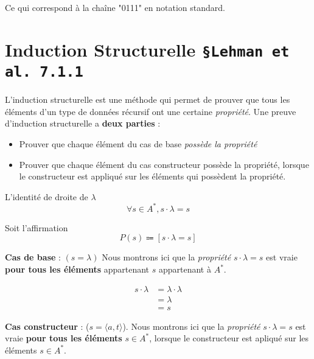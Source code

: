 \documentclass[16pt]{report}
\begin{document}
\begin{multicols*}{2}
\begin{EExample}{}{}
Ce qui correspond à la chaîne "0111" en notation standard.
\end{EExample}


    \section{Induction Structurelle \texttt{\small{\S Lehman et al. 7.1.1}}}
    L'induction structurelle est une méthode qui permet de prouver que tous les éléments d'un type de données 
    récursif ont une certaine \textit{propriété}. Une preuve d'induction structurelle a \textbf{deux parties} : 

    \begin{itemize}
        \item Prouver que chaque élément du cas de base \textit{possède la propriété}  
        \item Prouver que chaque élément du cas constructeur possède la propriété, lorsque 
            le constructeur est appliqué sur les éléments qui possèdent la propriété. 
    \end{itemize}           


    \begin{Lemme}{L'identité de droite de $\lambda$}{}
                     \[ \forall s \in A^*, s \cdot \lambda = s \]  
    \end{Lemme}

    \begin{Preuve}{}{}
        Soit l'affirmation 
        \[ P(s) \Coloneqq \left[ s \cdot \lambda = s \right] \]
        
        \textbf{Cas de base} : $( s = \lambda)$  
        Nous montrons ici que la \textit{propriété} $s \cdot \lambda = s$ est vraie \textbf{pour tous les éléments}
        appartenant $s$ appartenant à $A^*$. 
        
        \begin{align*}
                        s \cdot \lambda &= \lambda \cdot \lambda \\ 
                              &= \lambda \\
                              &= s
        \end{align*}

        \textbf{Cas constructeur} : ($s = \langle a, t\rangle$). Nous montrons ici que la 
        \textit{propriété} $s \cdot \lambda = s$ est vraie \textbf{pour tous les éléments}   $s \in A^*$, lorsque 
        le constructeur est apliqué sur les éléments $s \in A^*$. 


\end{Preuve}
\end{multicols*}
\end{document}
